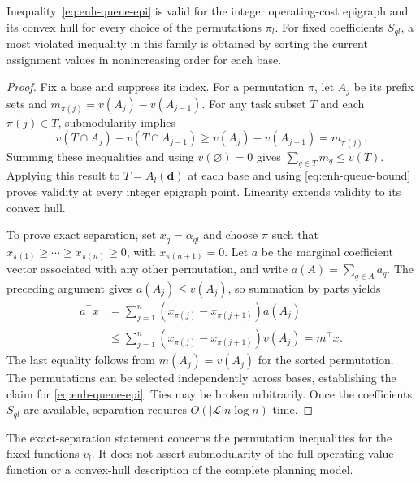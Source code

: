 \begin{proposition}
\label{prop:enh-epi}
Inequality~\eqref{eq:enh-queue-epi} is valid for the integer operating-cost epigraph and its convex hull for every choice of the permutations $\pi_l$.
For fixed coefficients $S_{ql}$, a most violated inequality in this family is obtained by sorting the current assignment values in nonincreasing order for each base.
\end{proposition}

\begin{proof}
Fix a base and suppress its index.
For a permutation $\pi$, let $A_j$ be its prefix sets and $m_{\pi(j)}=v(A_j)-v(A_{j-1})$.
For any task subset $T$ and each $\pi(j)\in T$, submodularity implies
\[
    v(T\cap A_j)-v(T\cap A_{j-1})
    \ge v(A_j)-v(A_{j-1})=m_{\pi(j)}.
\]
Summing these inequalities and using $v(\varnothing)=0$ gives $\sum_{q\in T}m_q\le v(T)$.
Applying this result to $T=A_l(\boldsymbol d)$ at each base and using \eqref{eq:enh-queue-bound} proves validity at every integer epigraph point.
Linearity extends validity to its convex hull.

To prove exact separation, set $x_q=\bar\alpha_{ql}$ and choose $\pi$ such that $x_{\pi(1)}\ge\cdots\ge x_{\pi(n)}\ge0$, with $x_{\pi(n+1)}=0$.
Let $a$ be the marginal coefficient vector associated with any other permutation, and write $a(A)=\sum_{q\in A}a_q$.
The preceding argument gives $a(A_j)\le v(A_j)$, so summation by parts yields
\begin{equation}
    \begin{aligned}
    a^\top x
    &=\sum_{j=1}^{n}(x_{\pi(j)}-x_{\pi(j+1)})a(A_j)\\
    &\le\sum_{j=1}^{n}(x_{\pi(j)}-x_{\pi(j+1)})v(A_j)
    =m^\top x.
    \end{aligned}
    \label{eq:enh-app-separation}
\end{equation}
The last equality follows from $m(A_j)=v(A_j)$ for the sorted permutation.
The permutations can be selected independently across bases, establishing the claim for \eqref{eq:enh-queue-epi}.
Ties may be broken arbitrarily.
Once the coefficients $S_{ql}$ are available, separation requires $O(|\mathcal L|n\log n)$ time.
\end{proof}

The exact-separation statement concerns the permutation inequalities for the fixed functions $v_l$.
It does not assert submodularity of the full operating value function or a convex-hull description of the complete planning model.

